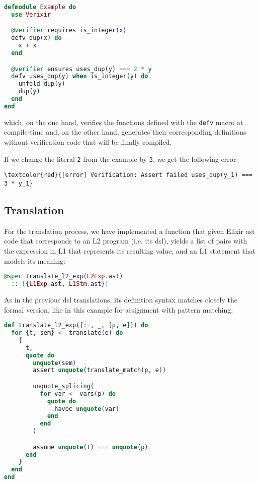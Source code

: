 \begin{lstlisting}[language=elixir,numbers=none,frame=none]
defmodule Example do
  use Verixir 

  @verifier requires is_integer(x)
  defv dup(x) do
    x + x
  end

  @verifier ensures uses_dup(y) === 2 * y
  defv uses_dup(y) when is_integer(y) do
    unfold dup(y)
    dup(y)
  end
end
\end{lstlisting}

which, on the one hand, verifies the functions defined with the \verb|defv|
macro at compile-time and, on the other hand, generates their corresponding
definitions without verification code that will be finally compiled.

If we change the literal \verb|2| from the example by \verb|3|, we get the
following error:

\begin{Verbatim}[commandchars=\\\{\}]
      \textcolor{red}{[error] Verification: Assert failed uses_dup(y_1) === 3 * y_1}
\end{Verbatim}

\subsection{Translation}
For the translation process, we have implemented a function that given Elixir \gls{ast}
code that corresponds to an L2 program (i.e. its \gls{dsl}), yields a list of
pairs with the expression in L1 that represents its resulting value, and an L1
statement that models its meaning:

\begin{lstlisting}[language=elixir,numbers=none,frame=none]
@spec translate_l2_exp(L2Exp.ast) 
  :: [{L1Exp.ast, L1Stm.ast}]
\end{lstlisting}

As in the previous \gls{dsl} translations, its definition syntax matches closely
the formal version, like in this example for assignment with pattern matching:

\begin{lstlisting}[language=elixir,numbers=none,frame=none]
def translate_l2_exp({:=, _, [p, e]}) do
  for {t, sem} <- translate(e) do
    {
      t,
      quote do
        unquote(sem)
        assert unquote(translate_match(p, e))

        unquote_splicing(
          for var <- vars(p) do
            quote do
              havoc unquote(var)
            end
          end
        )

        assume unquote(t) === unquote(p)
      end
    }
  end
end
\end{lstlisting}

